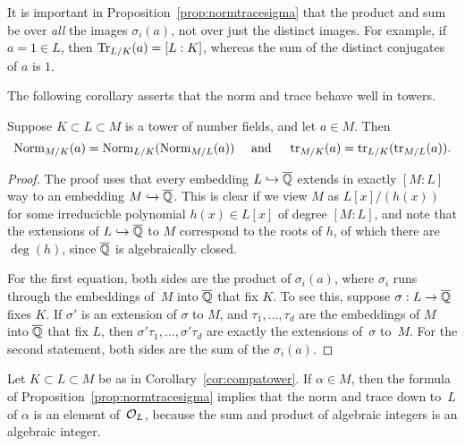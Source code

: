 It is important in Proposition~\ref{prop:normtracesigma} that
the product and sum be over {\em all} the images $\sigma_i(a)$,
not over just the distinct images.  For example, if $a=1\in L$, then
$\operatorname{Tr}_{L/K}(a) = [L:K]$, whereas the sum of the distinct conjugates
of $a$ is $1$.

The following corollary asserts that the norm and trace behave well in
towers.
\begin{corollary}
	\label{cor:compatower}
	Suppose $K\subset L \subset M$ is a tower of number fields, and
	let $a\in M$.  Then
	$$
		\operatorname{Norm}_{M/K}(a) = \operatorname{Norm}_{L/K}(\operatorname{Norm}_{M/L}(a))
		\quad\text{ and }\quad
		\operatorname{tr}_{M/K}(a) = \operatorname{tr}_{L/K}(\operatorname{tr}_{M/L}(a)).
	$$
\end{corollary}
\begin{proof}
	The proof uses that every embedding $L\hookrightarrow \overline{\mathbb{Q}}$ extends in exactly
	$[M:L]$ way to an embedding $M\hookrightarrow \overline{\mathbb{Q}}$.  This is clear
	if we view $M$ as $L[x]/(h(x))$ for some irreducicble
	polynomial $h(x) \in L[x]$ of degree $[M:L]$, and note that
	the extensions of $L\hookrightarrow \overline{\mathbb{Q}}$ to $M$ correspond to
	the roots of $h$, of which there are $\deg(h)$, since $\overline{\mathbb{Q}}$
	is algebraically closed.
	
	For the first equation, both sides are the product of $\sigma_i(a)$,
	where $\sigma_i$ runs through the embeddings of~$M$ into $\overline{\mathbb{Q}}$
	that fix $K$.  To see this, suppose $\sigma:L\to \overline{\mathbb{Q}}$ fixes $K$.
	If $\sigma'$ is an extension of $\sigma$ to $M$, and $\tau_1,\ldots,
	\tau_d$ are the embeddings of $M$ into $\overline{\mathbb{Q}}$ that fix $L$, then
	$\sigma'\tau_1,\ldots,\sigma'\tau_d$ are exactly the extensions
	of~$\sigma$ to~$M$.  For the second statement, both sides are the
	sum of the $\sigma_i(a)$.
\end{proof}

Let $K\subset L\subset M$ be as in Corollary~\ref{cor:compatower}.  If
$\alpha\in M$, then the formula of
Proposition~\ref{prop:normtracesigma} implies that the norm and trace
down to~$L$ of $\alpha$ is an element of~$\mathcal{O}_L$, because the sum and
product of algebraic integers is an algebraic integer.

